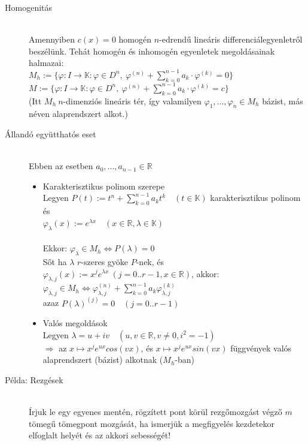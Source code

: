 \documentclass[margin=0px]{article}
\newcommand{\R}{\mathbb{R}}
\begin{document}
\begin{description}
				\item[Homogenitás] \hfill \\
					Amennyiben $c(x) = 0$ homogén $n$-edrendű lineáris differenciálegyenletről beszélünk. Tehát homogén és inhomogén egyenletek megoldásainak halmazai: \\
					$ M_h := \{\varphi : I \rightarrow \mathbb{K} : \varphi \in D^n, \ \varphi^{(n)} + \sum\limits_{k=0}^{n-1}a_k\cdot\varphi^{(k)} = 0 \} $ \\
					$ M := \{\varphi : I \rightarrow \mathbb{K} : \varphi \in D^n, \ \varphi^{(n)} + \sum\limits_{k=0}^{n-1}a_k\cdot\varphi^{(k)} = c \} $ \\
					(Itt $M_h \ n$-dimenziós lineáris tér, így valamilyen $ \varphi_1,...,\varphi_n \in M_h$ bázist, más néven alaprendszert alkot.)
				\item[Állandó együtthatós eset] \hfill \\
					Ebben az esetben $a_0,...,a_{n-1} \in \R$
					\begin{itemize}
						\item Karakterisztikus polinom szerepe \\
							Legyen $P(t) := t^n + \sum\limits_{k=0}^{n-1}a_kt^k \quad (t \in \mathbb{K})$ karakterisztikus polinom és \\
							$ \varphi_\lambda(x) := e^{\lambda x} \quad (x \in \R, \lambda \in \mathbb{K}) $ \\\\
							Ekkor: $ \varphi_\lambda \in M_h \Longleftrightarrow P(\lambda) = 0 $\\
							Sőt ha $ \lambda $ $r$-szeres gyöke $P$-nek, és \\
							$ \varphi_{\lambda,j}(x) := x^je^{\lambda x} \ (j = 0..r-1, x\in\R)$, akkor:
							$ \varphi_{\lambda,j} \in M_h \Longleftrightarrow \varphi_{\lambda, j}^{(n)}+\sum\limits_{k=0}^{n-1}a_k\varphi_{\lambda, j}^{(k)} $ \\ 
							azaz $P(\lambda)^{(j)} = 0 \quad (j = 0..r-1)$
						\item Valós megoldások \\
							Legyen $ \lambda = u+iv \quad (u,v \in \R, v\neq0, i^2 = -1) $ \\
							$ \Rightarrow $ az $ x \mapsto x^je^{ux}cos(vx)$, és $x \mapsto x^je^{ux}sin(vx)$ függvények valós alaprendszert (bázist) alkotnak ($M_h$-ban)
					\end{itemize}
				\item[Példa: Rezgések] \hfill \\
					Írjuk le egy egyenes mentén, rögzített pont körül rezgőmozgást végző $m$ tömegű tömegpont mozgását, ha ismerjük a megfigyelés kezdetekor elfoglalt helyét és az akkori sebességét! \\

\end{description}
\end{document}
